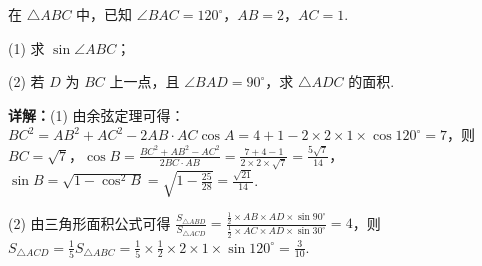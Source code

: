 \begin{question}[points=12]
在 $\triangle ABC$ 中，已知 $\angle BAC=120^\circ$，$AB=2$，$AC=1$.



(1) 求 $\sin\angle ABC$；



(2) 若 $D$ 为 $BC$ 上一点，且 $\angle BAD=90^\circ$，求 $\triangle ADC$ 的面积.
\begin{solution}

\textbf{详解：}(1) 由余弦定理可得：$BC^2=AB^2+AC^2-2AB\cdot AC\cos A=4+1-2\times2\times1\times\cos120^\circ=7$，则 $BC=\sqrt{7}$，$\cos B=\frac{BC^2+AB^2-AC^2}{2BC\cdot AB}=\frac{7+4-1}{2\times2\times\sqrt{7}}=\frac{5\sqrt{7}}{14}$，$\sin B=\sqrt{1-\cos^2B}=\sqrt{1-\frac{25}{28}}=\frac{\sqrt{21}}{14}$.

(2) 由三角形面积公式可得 $\frac{S_{\triangle ABD}}{S_{\triangle ACD}}=\frac{\frac{1}{2}\times AB\times AD\times\sin90^\circ}{\frac{1}{2}\times AC\times AD\times\sin30^\circ}=4$，则 $S_{\triangle ACD}=\frac{1}{5}S_{\triangle ABC}=\frac{1}{5}\times\frac{1}{2}\times2\times1\times\sin120^\circ=\frac{3}{10}$.
\end{solution}
\end{question}

